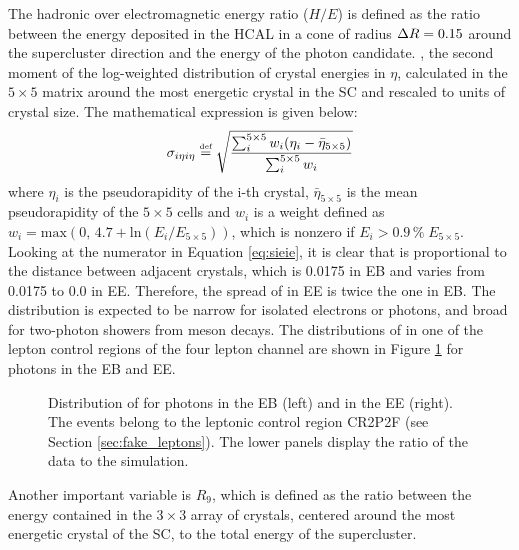 The hadronic over electromagnetic energy ratio ($H/E$) is defined as the ratio between the energy deposited in the HCAL in a cone of radius $\Delta R = 0.15$
around the supercluster direction and the energy of the photon candidate.
\sieie, the second moment of the log-weighted distribution of crystal energies in $\eta$,
calculated in the $5 \times 5$ matrix around the most energetic crystal in the SC and rescaled to units of crystal size.
The mathematical expression is given below:
\begin{equation}
\label{eq:sieie}
\sigma_{i \eta i \eta} \stackrel{\text{\tiny def}}{=} \sqrt{ \frac{\sum_i^{5 \times 5} w_i(\eta_i - \bar{\eta}_{5 \times 5})}{\sum_i^{5 \times 5} w_i} }
\end{equation}
where $\eta_i$ is the pseudorapidity of the i-th crystal,
$\bar{\eta}_{5 \times 5}$ is the mean pseudorapidity of the $5 \times 5$ cells
and $w_i$ is a weight defined as $w_i = \mathrm{max}(0,\, 4.7 + \mathrm{ln}(E_i/E_{5 \times 5}))$,
which is nonzero if $E_i > 0.9\, \%\; E_{5 \times 5}$.
Looking at the numerator in Equation \ref{eq:sieie}, it is clear that \sieie is proportional to the distance between adjacent crystals,
which is 0.0175 in EB and varies from 0.0175 to 0.0 in EE.
Therefore, the spread of \sieie in EE is twice the one in EB.
The \sieie distribution is expected to be narrow for isolated electrons or photons, and broad for two-photon showers from meson decays.
The distributions of \sieie in one of the lepton control regions of the four lepton channel
are shown in Figure \ref{fig:sieie_CR2P2F} for photons in the EB and EE.

\begin{figure}
  \centering
  \hfill
  \hfill
  \hfill\mbox{}
\caption{Distribution of \sieie for photons in the EB (left) and in the EE (right).
The events belong to the leptonic control region CR2P2F (see Section \ref{sec:fake_leptons}).
The lower panels display the ratio of the data to the simulation.}
\label{fig:sieie_CR2P2F}
\end{figure}

Another important variable is $R_9$, which is defined as the ratio between the energy contained in the $3 \times 3$ array of crystals,
centered around the most energetic crystal of the SC,
to the total energy of the supercluster.

